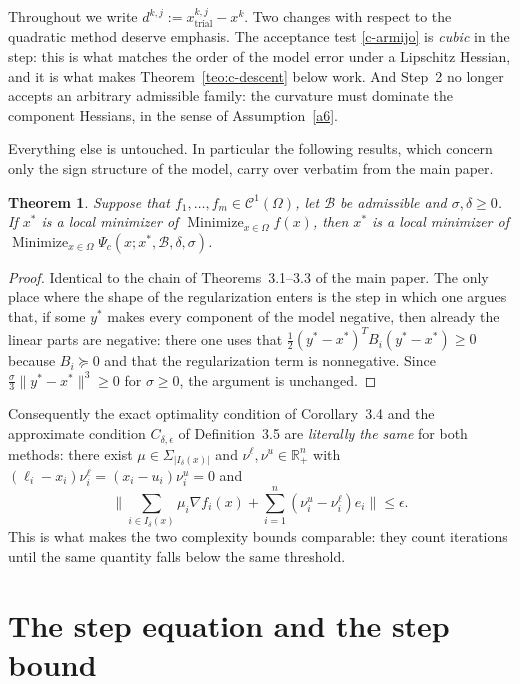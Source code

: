 \documentclass[11pt]{article}
\newcommand{\xkjtrial}{x^{k,j}_{\mathrm{trial}}}
\newcommand{\minimize}{\mathop{\text{Minimize}}}
\newcommand{\dkj}{d^{k,j}}
\newtheorem{theorem}{Theorem}[section]
\begin{document}
Throughout we write $\dkj := \xkjtrial - x^k$. Two changes with respect to the
quadratic method deserve emphasis. The acceptance test \eqref{c-armijo} is
\emph{cubic} in the step: this is what matches the order of the model error
under a Lipschitz Hessian, and it is what makes Theorem~\ref{teo:c-descent}
below work. And Step~2 no longer accepts an arbitrary admissible family: the
curvature must dominate the component Hessians, in the sense of
Assumption~\ref{a6}.

Everything else is untouched. In particular the following results, which
concern only the sign structure of the model, carry over verbatim from the main
paper.

\begin{theorem} \label{teo:c-conv}
Suppose that $f_1,\dots,f_m \in \mathcal{C}^1(\Omega)$, let $\mathcal{B}$ be
admissible and $\sigma, \delta \geq 0$. If $x^*$ is a local minimizer of
$\minimize_{x\in\Omega} f(x)$, then $x^*$ is a local minimizer of
$\minimize_{x \in \Omega} \Psi_c(x; x^*, \mathcal{B}, \delta, \sigma)$.
\end{theorem}

\begin{proof}
Identical to the chain of Theorems~3.1--3.3 of the main paper. The only place
where the shape of the regularization enters is the step in which one argues
that, if some $y^*$ makes every component of the model negative, then already
the linear parts are negative: there one uses that
$\tfrac{1}{2}(y^*-x^*)^TB_i(y^*-x^*) \geq 0$ because $B_i \succeq 0$ and that
the regularization term is nonnegative. Since
$\tfrac{\sigma}{3}\|y^*-x^*\|^3 \geq 0$ for $\sigma \geq 0$, the argument is
unchanged.
\end{proof}

Consequently the exact optimality condition of Corollary~3.4 and the
approximate condition $C_{\delta,\epsilon}$ of Definition~3.5 are
\emph{literally the same} for both methods: there exist
$\mu \in \Sigma_{|I_\delta(x)|}$ and $\nu^\ell,\nu^u \in \mathbb{R}^n_+$ with
$(\ell_i - x_i)\nu^\ell_i = (x_i - u_i)\nu^u_i = 0$ and
\begin{equation} \label{c-optcond}
\Big\| \sum_{i \in I_\delta(x)} \mu_i \nabla f_i(x)
+ \sum_{i=1}^n (\nu^u_i - \nu^\ell_i)e_i \Big\| \leq \epsilon .
\end{equation}
This is what makes the two complexity bounds comparable: they count iterations
until the same quantity falls below the same threshold.

\section{The step equation and the step bound}
\end{document}
